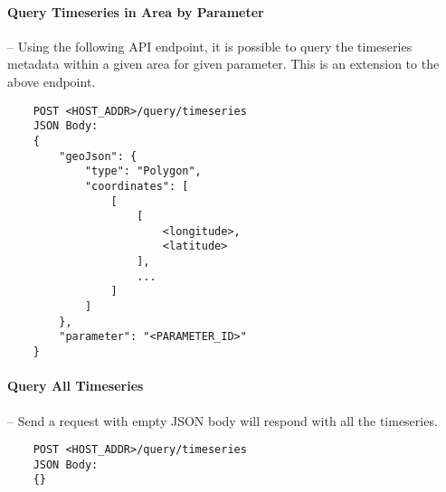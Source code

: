 \paragraph{Query Timeseries in Area by Parameter}-- Using the following API endpoint, it is possible to query the timeseries metadata within a given area for given parameter. This is an extension to the above endpoint.
\begin{lstlisting}
    POST <HOST_ADDR>/query/timeseries
    JSON Body:
    {
        "geoJson": {
            "type": "Polygon",
            "coordinates": [
                [
                    [
                        <longitude>,
                        <latitude>
                    ],
                    ...
                ]
            ]
        },
        "parameter": "<PARAMETER_ID>"
    }
\end{lstlisting}

\paragraph{Query All Timeseries} -- Send a request with empty JSON body will respond with all the timeseries.
\begin{lstlisting}
    POST <HOST_ADDR>/query/timeseries
    JSON Body:
    {}
\end{lstlisting}

